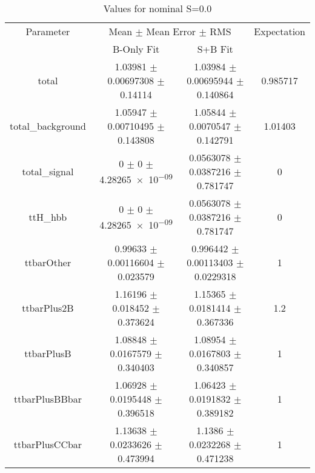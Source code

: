 \begin{table}
\centering
\caption{Values for nominal S=0.0}
\begin{tabular}{cccc}
\toprule
Parameter & \multicolumn{2}{c}{Mean $\pm$ Mean Error $\pm$ RMS} & Expectation\\
 & B-Only Fit & S+B Fit & \\
\midrule
total & \num{1.03981} $\pm$ \num{0.00697308} $\pm$ \num{0.14114} & \num{1.03984} $\pm$ \num{0.00695944} $\pm$ \num{0.140864} & \num{0.985717}\\
total\_background & \num{1.05947} $\pm$ \num{0.00710495} $\pm$ \num{0.143808} & \num{1.05844} $\pm$ \num{0.0070547} $\pm$ \num{0.142791} & \num{1.01403}\\
total\_signal & \num{0} $\pm$ \num{0} $\pm$ \num{4.28265e-09} & \num{0.0563078} $\pm$ \num{0.0387216} $\pm$ \num{0.781747} & \num{0}\\
ttH\_hbb & \num{0} $\pm$ \num{0} $\pm$ \num{4.28265e-09} & \num{0.0563078} $\pm$ \num{0.0387216} $\pm$ \num{0.781747} & \num{0}\\
ttbarOther & \num{0.99633} $\pm$ \num{0.00116604} $\pm$ \num{0.023579} & \num{0.996442} $\pm$ \num{0.00113403} $\pm$ \num{0.0229318} & \num{1}\\
ttbarPlus2B & \num{1.16196} $\pm$ \num{0.018452} $\pm$ \num{0.373624} & \num{1.15365} $\pm$ \num{0.0181414} $\pm$ \num{0.367336} & \num{1.2}\\
ttbarPlusB & \num{1.08848} $\pm$ \num{0.0167579} $\pm$ \num{0.340403} & \num{1.08954} $\pm$ \num{0.0167803} $\pm$ \num{0.340857} & \num{1}\\
ttbarPlusBBbar & \num{1.06928} $\pm$ \num{0.0195448} $\pm$ \num{0.396518} & \num{1.06423} $\pm$ \num{0.0191832} $\pm$ \num{0.389182} & \num{1}\\
ttbarPlusCCbar & \num{1.13638} $\pm$ \num{0.0233626} $\pm$ \num{0.473994} & \num{1.1386} $\pm$ \num{0.0232268} $\pm$ \num{0.471238} & \num{1}\\
\bottomrule
\end{tabular}
\end{table}